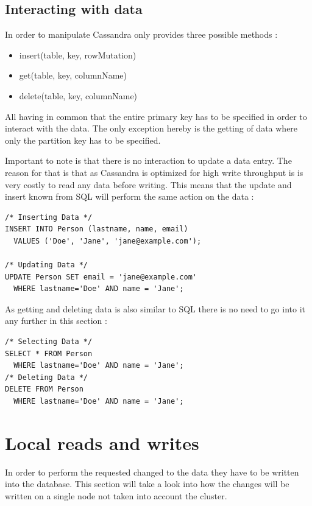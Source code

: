 \subsection{Interacting with data}
In order to manipulate Cassandra only provides three possible methods \autocite{cassandra_paper}:
\begin{itemize}
    \item insert(table, key, rowMutation)
    \item get(table, key, columnName)
    \item delete(table, key, columnName)
\end{itemize}
All having in common that the entire primary key has to be specified in order to interact with the data. The only exception hereby is the getting of data where only the partition key has to be specified.

Important to note is that there is no interaction to update a data entry. The reason for that is that as Cassandra is optimized for high write throughput is is very costly to read any data before writing. This means that the update and insert known from SQL will perform the same action on the data \autocite{cqlAlexMeng, newInCQL3}:
\begin{verbatim}
/* Inserting Data */
INSERT INTO Person (lastname, name, email)
  VALUES ('Doe', 'Jane', 'jane@example.com');

/* Updating Data */
UPDATE Person SET email = 'jane@example.com'
  WHERE lastname='Doe' AND name = 'Jane';
\end{verbatim}

As getting and deleting data is also similar to SQL there is no need to go into it any further in this section \autocite{cqlAlexMeng, cassandra3cqldocSelect}:
\begin{verbatim}
/* Selecting Data */
SELECT * FROM Person
  WHERE lastname='Doe' AND name = 'Jane';
/* Deleting Data */
DELETE FROM Person
  WHERE lastname='Doe' AND name = 'Jane';
\end{verbatim}

\section{Local reads and writes}
In order to perform the requested changed to the data they have to be written into the database. This section will take a look into how the changes will be written on a single node not taken into account the cluster.

